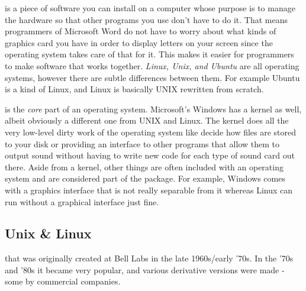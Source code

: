 \documentclass{tufte-book} %
\begin{document}
 is a piece of software you can install on a computer whose purpose is to manage the hardware so that other programs you use don't have to do it. That means programmers of Microsoft Word do not have to worry about what kinds of graphics card you have in order to display letters on your screen since the operating system takes care of that for it. This makes it easier for programmers to make software that works together. 
\emph{Linux, Unix, and Ubuntu} are all operating systems, however there are subtle differences between them. For example Ubuntu is a kind of Linux, and Linux is basically UNIX rewritten from scratch.

 is the \textit{core} part of an operating system. Microsoft's Windows has a kernel as well, albeit obviously a different one from UNIX and Linux. The kernel does all the very low-level dirty work of the operating system like decide how files are stored to your disk or providing an interface to other programs that allow them to output sound without having to write new code for each type of sound card out there. Aside from a kernel, other things are often included with an operating system and are considered part of the package. For example, Windows comes with a graphics interface that is not really separable from it whereas Linux can run without a graphical interface just fine.

\subsection{Unix \& Linux}
 that was originally created at Bell Labs in the late 1960s/early '70s. In the '70s and '80s it became very popular, and various derivative versions were made - some by commercial companies.
\end{document}
